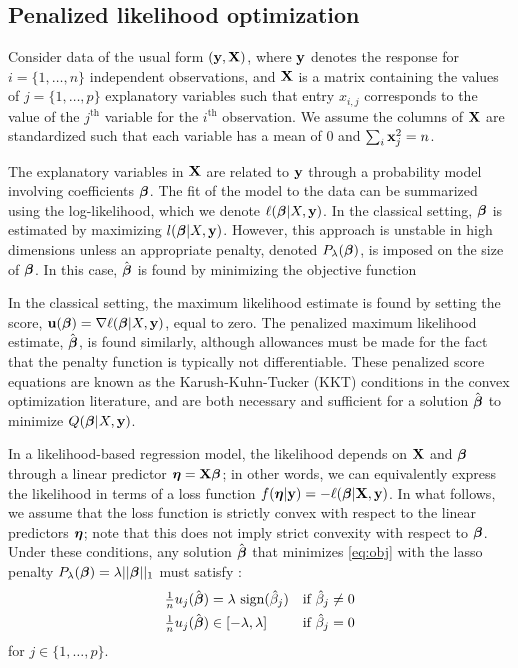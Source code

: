 \subsection{Penalized likelihood optimization}

Consider data of the usual form $(\mathbf{y}, \mathbf{X})$, where $\mathbf{y}$ denotes the response for $i = \{1, \ldots, n\}$ independent observations, and $\mathbf{X}$ is a matrix containing the values of $j = \{1, \ldots, p\}$ explanatory variables such that entry $x_{i,j}$ corresponds to the value of the $j^{\textrm{th}}$ variable for the $i^{\textrm{th}}$ observation.  We assume the columns of $\mathbf{X}$ are standardized such that each variable has a mean of $0$ and $\sum_i \mathbf{x}_j^2 = n$.

The explanatory variables in $\mathbf{X}$ are related to $\mathbf{y}$ through a probability model involving coefficients $\boldsymbol{\beta}$.  The fit of the model to the data can be summarized using the log-likelihood, which we denote $\ell(\boldsymbol{\beta}|X,\mathbf{y})$.  In the classical setting, $\boldsymbol{\beta}$ is estimated by maximizing $l(\boldsymbol{\beta}|X,\mathbf{y})$.  However, this approach is unstable in high dimensions unless an appropriate penalty, denoted $P_{\lambda}(\boldsymbol{\beta})$, is imposed on the size of $\boldsymbol{\beta}$.
In this case, $\hat{\boldsymbol{\beta}}$ is found by minimizing the objective function


In the classical setting, the maximum likelihood estimate is found by setting the score, $\mathbf{u}(\boldsymbol{\beta}) = \nabla \ell(\boldsymbol{\beta}|X,\mathbf{y})$, equal to zero.  The penalized maximum likelihood estimate, $\hat{\boldsymbol{\beta}}$, is found similarly, although allowances must be made for the fact that the penalty function is typically not differentiable.  These penalized score equations are known as the Karush-Kuhn-Tucker (KKT) conditions in the convex optimization literature, and are both necessary and sufficient for a solution $\hat{\boldsymbol{\beta}}$ to minimize $Q(\boldsymbol{\beta}|X,\mathbf{y})$.

In a likelihood-based regression model, the likelihood depends on $\mathbf{X}$ and $\boldsymbol{\beta}$ through a linear predictor $\boldsymbol{\eta} = \mathbf{X}\boldsymbol{\beta}$; in other words, we can equivalently express the likelihood in terms of a loss function $f(\boldsymbol{\eta}|\mathbf{y})=-\ell(\boldsymbol{\beta}|\mathbf{X},\mathbf{y})$.
In what follows, we assume that the loss function is strictly convex with respect to the linear predictors $\boldsymbol{\eta}$; note that this does not imply strict convexity with respect to $\boldsymbol{\beta}$.
Under these conditions, any solution $\hat{\boldsymbol{\beta}}$ that minimizes \eqref{eq:obj} with the lasso penalty $P_{\lambda} (\boldsymbol{\beta}) = \lambda||\boldsymbol{\beta}||_1$ must satisfy \citep{lasso_kkt}:
\begin{equation}
  \label{eq:kkt}
  \begin{alignedat}{2}
  \tfrac{1}{n}u_j(\hat{\boldsymbol{\beta}}) &= \lambda \textrm{ sign}(\hat{\beta}_j) &\quad \text{if } \hat{\beta}_j &\neq 0 \\
  \tfrac{1}{n}u_j(\hat{\boldsymbol{\beta}}) &\in [-\lambda,\lambda]  &\quad \text{if }  \hat{\beta}_j &= 0
  \end{alignedat}
\end{equation}
for $j \in \{1, \ldots, p\}$.

